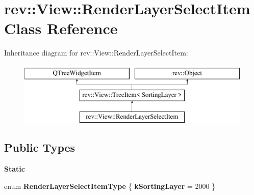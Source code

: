 \hypertarget{classrev_1_1_view_1_1_render_layer_select_item}{}\section{rev\+::View\+::Render\+Layer\+Select\+Item Class Reference}
\label{classrev_1_1_view_1_1_render_layer_select_item}
Inheritance diagram for rev\+::View\+::Render\+Layer\+Select\+Item\+:\begin{figure}[H]
\begin{center}
\leavevmode
\includegraphics[height=3.000000cm]{classrev_1_1_view_1_1_render_layer_select_item}
\end{center}
\end{figure}
\subsection*{Public Types}
\begin{Indent}\textbf{ Static}\par
\begin{DoxyCompactItemize}
\item 
\mbox{\label{classrev_1_1_view_1_1_render_layer_select_item_ace0cd747012c09765457a2336d714b02}} 
enum {\bfseries Render\+Layer\+Select\+Item\+Type} \{ {\bfseries k\+Sorting\+Layer} = 2000
 \}
\end{DoxyCompactItemize}
\end{Indent}
